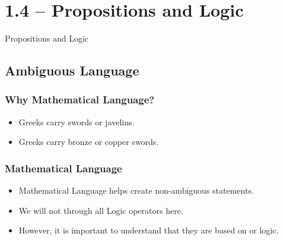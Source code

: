 \documentclass{beamer}
\begin{document}

\section{1.4 -- Propositions and Logic}

\begin{frame}
  \begin{center}
    Propositions and Logic
  \end{center}
\end{frame}

\subsection{Ambiguous Language}
\begin{frame}
  \frametitle{Why Mathematical Language?}

  \begin{itemize}
  \item Greeks carry swords or javelins.

    \bigskip

  \item Greeks carry bronze or copper swords.
  \end{itemize}
\end{frame}

\begin{frame}
  \frametitle{Mathematical Language}
  \begin{itemize}
  \item Mathematical Language helps create non-ambiguous statements.
    \bigskip
    
  \item We will not through all Logic operators here.
    \bigskip

  \item However, it is important to understand that they are based on
     or  logic.
  \end{itemize}
\end{frame}

\end{document}
